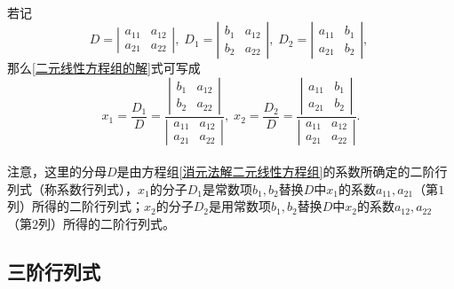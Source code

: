 \paragraph{}
若记
\begin{equation*}
  D = \left|\begin{array}{cc} a_{11} & a_{12} \\ a_{21} & a_{22} \end{array}\right|, \;
  D_1 = \left|\begin{array}{cc} b_1 & a_{12} \\ b_2 & a_{22} \end{array}\right|, \;
  D_2 = \left|\begin{array}{cc} a_{11} & b_1 \\ a_{21} & b_2 \end{array}\right|, \;
\end{equation*}
那么\eqref{二元线性方程组的解}式可写成
\begin{equation*}
  x_1 = \frac{D_1}{D} = \frac{\left|\begin{array}{cc} b_1 & a_{12} \\ b_2 & a_{22} \end{array}\right|}{\left|\begin{array}{cc} a_{11} & a_{12} \\ a_{21} & a_{22} \end{array}\right|}, \;
  x_2 = \frac{D_2}{D} = \frac{\left|\begin{array}{cc} a_{11} & b_1 \\ a_{21} & b_2 \end{array}\right|}{\left|\begin{array}{cc} a_{11} & a_{12} \\ a_{21} & a_{22} \end{array}\right|}.
\end{equation*}

\paragraph{}
注意，这里的分母$D$是由方程组\eqref{消元法解二元线性方程组}的系数所确定的二阶行列式（称系数行列式），$x_1$的分子$D_1$是常数项$b_1,b_2$替换$D$中$x_1$的系数$a_{11}, a_{21}$（第$1$列）所得的二阶行列式；$x_2$的分子$D_2$是用常数项$b_1, b_2$替换$D$中$x_2$的系数$a_{12}, a_{22}$（第$2$列）所得的二阶行列式。

\subsection{三阶行列式}
